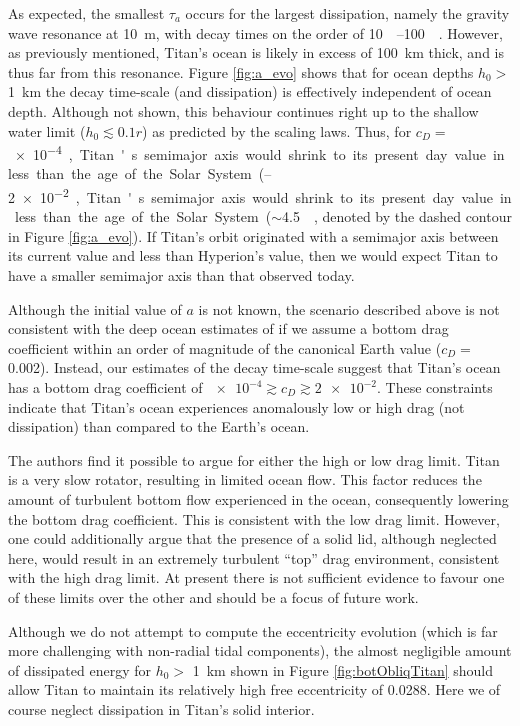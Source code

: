 As expected, the smallest $\tau_a$ occurs for the largest dissipation, namely the gravity wave resonance at \SI{10}{\metre}, with decay times on the order of \SIrange{10}{100}{\mega\year}. However, as previously mentioned, Titan's ocean is likely in excess of \SI{100}{\kilo\metre} thick, and is thus far from this resonance. Figure \ref{fig:a_evo} shows that for ocean depths $h_0 >$ \SI{1}{\kilo\metre} the decay time-scale (and dissipation) is effectively independent of ocean depth. Although not shown, this behaviour continues right up to the shallow water limit ($h_0 \lesssim 0.1r$) as predicted by the \citet{chen2013tidal} scaling laws. Thus, for $c_D =$ \SIrange{e-4}{2e-2}, Titan's semimajor axis would shrink to its present day value in less than the age of the Solar System ($\sim$\SI{4.5}{\giga\year}, denoted by the dashed contour in Figure \ref{fig:a_evo}). If Titan's orbit originated with a semimajor axis between its current value and less than Hyperion's value, then we would expect Titan to have a smaller semimajor axis than that observed today.

Although the initial value of $a$ is not known, the scenario described above is not consistent with the deep ocean estimates of \citet{sohl2003interior} if we assume a bottom drag coefficient within an order of magnitude of the canonical Earth value ($c_D =$ \num{0.002}). Instead, our estimates of the decay time-scale suggest that Titan's ocean has a bottom drag coefficient of \hbox{$ \num{e-4} \gtrsim c_D \gtrsim \num{2e-2} $}. These constraints indicate that Titan's ocean experiences anomalously low or high drag (not dissipation) than compared to the Earth's ocean.

The authors find it possible to argue for either the high or low drag limit. Titan is a very slow rotator, resulting in limited ocean flow. This factor reduces the amount of turbulent bottom flow experienced in the ocean, consequently lowering the bottom drag coefficient. This is consistent with the low drag limit. However, one could additionally argue that the presence of a solid lid, although neglected here, would result in an extremely turbulent ``top'' drag environment, consistent with the high drag limit. At present there is not sufficient evidence to favour one of these limits over the other and should be a focus of future work.  

Although we do not attempt to compute the eccentricity evolution (which is far more challenging with non-radial tidal components), the almost negligible amount of dissipated energy for $h_0 >$ \SI{1}{\kilo\metre} shown in Figure \ref{fig:botObliqTitan} should allow Titan to maintain its relatively high free eccentricity of 0.0288. Here we of course neglect dissipation in Titan's solid interior.